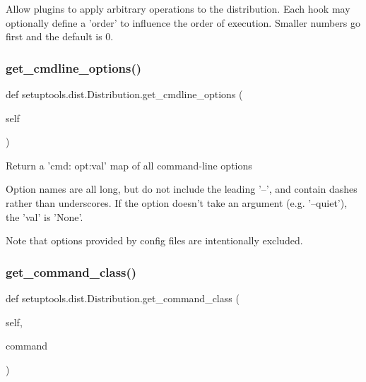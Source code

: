 \begin{DoxyVerb}Allow plugins to apply arbitrary operations to the
distribution. Each hook may optionally define a 'order'
to influence the order of execution. Smaller numbers
go first and the default is 0.
\end{DoxyVerb}
 \mbox{\label{classsetuptools_1_1dist_1_1Distribution_ac8c369e93a63e253f99d4d2ae842b250}} 
\subsubsection{\texorpdfstring{get\+\_\+cmdline\+\_\+options()}{get\_cmdline\_options()}}
{\footnotesize\ttfamily def setuptools.\+dist.\+Distribution.\+get\+\_\+cmdline\+\_\+options (\begin{DoxyParamCaption}\item[{}]{self }\end{DoxyParamCaption})}

\begin{DoxyVerb}Return a '{cmd: {opt:val}}' map of all command-line options

Option names are all long, but do not include the leading '--', and
contain dashes rather than underscores.  If the option doesn't take
an argument (e.g. '--quiet'), the 'val' is 'None'.

Note that options provided by config files are intentionally excluded.
\end{DoxyVerb}
 \mbox{\label{classsetuptools_1_1dist_1_1Distribution_a76159456291f4bb9ed2ccb935d480240}} 
\subsubsection{\texorpdfstring{get\+\_\+command\+\_\+class()}{get\_command\_class()}}
{\footnotesize\ttfamily def setuptools.\+dist.\+Distribution.\+get\+\_\+command\+\_\+class (\begin{DoxyParamCaption}\item[{}]{self,  }\item[{}]{command }\end{DoxyParamCaption})}

